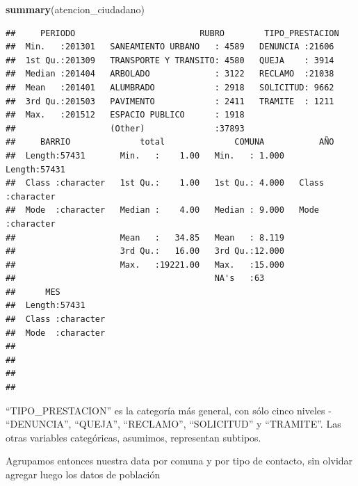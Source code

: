 \documentclass[]{book}
\newenvironment{Shaded}{\begin{snugshade}}{\end{snugshade}}
\newcommand{\KeywordTok}[1]{\textcolor[rgb]{0.13,0.29,0.53}{\textbf{#1}}}
\newcommand{\DataTypeTok}[1]{\textcolor[rgb]{0.13,0.29,0.53}{#1}}
\newcommand{\DecValTok}[1]{\textcolor[rgb]{0.00,0.00,0.81}{#1}}
\newcommand{\StringTok}[1]{\textcolor[rgb]{0.31,0.60,0.02}{#1}}
\newcommand{\OperatorTok}[1]{\textcolor[rgb]{0.81,0.36,0.00}{\textbf{#1}}}
\newcommand{\NormalTok}[1]{#1}
\begin{document}
\begin{Shaded}
\begin{Highlighting}[]
\KeywordTok{summary}\NormalTok{(atencion_ciudadano)}
\end{Highlighting}
\end{Shaded}

\begin{verbatim}
##     PERIODO                         RUBRO        TIPO_PRESTACION 
##  Min.   :201301   SANEAMIENTO URBANO   : 4589   DENUNCIA :21606  
##  1st Qu.:201309   TRANSPORTE Y TRANSITO: 4580   QUEJA    : 3914  
##  Median :201404   ARBOLADO             : 3122   RECLAMO  :21038  
##  Mean   :201401   ALUMBRADO            : 2918   SOLICITUD: 9662  
##  3rd Qu.:201503   PAVIMENTO            : 2411   TRAMITE  : 1211  
##  Max.   :201512   ESPACIO PUBLICO      : 1918                    
##                   (Other)              :37893                    
##     BARRIO              total              COMUNA           AÑO           
##  Length:57431       Min.   :    1.00   Min.   : 1.000   Length:57431      
##  Class :character   1st Qu.:    1.00   1st Qu.: 4.000   Class :character  
##  Mode  :character   Median :    4.00   Median : 9.000   Mode  :character  
##                     Mean   :   34.85   Mean   : 8.119                     
##                     3rd Qu.:   16.00   3rd Qu.:12.000                     
##                     Max.   :19221.00   Max.   :15.000                     
##                                        NA's   :63                         
##      MES           
##  Length:57431      
##  Class :character  
##  Mode  :character  
##                    
##                    
##                    
## 
\end{verbatim}

``TIPO\_PRESTACION'' es la categoría más general, con sólo cinco niveles
- ``DENUNCIA'', ``QUEJA'', ``RECLAMO'', ``SOLICITUD'' y ``TRAMITE''. Las
otras variables categóricas, asumimos, representan subtipos.

Agrupamos entonces nuestra data por comuna y por tipo de contacto, sin
olvidar agregar luego los datos de población

\begin{Shaded}
\end{Shaded}
\end{document}
